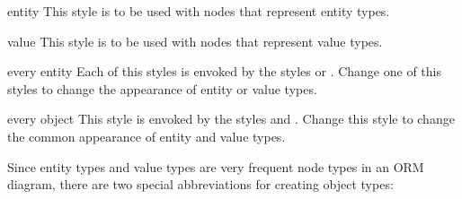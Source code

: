 \documentclass[a4paper,10pt]{article}
\begin{document}
\begin{stylekey}{entity}
This style is to be used with nodes that represent entity types.
\begin{codeexample}[]
\end{codeexample}
\end{stylekey}

\begin{stylekey}{value}
This style is to be used with nodes that represent value types.
\begin{codeexample}[]
\end{codeexample}
\end{stylekey}

\begin{stylekey}{every entity}
Each of this styles is envoked by the styles  or . Change one of this styles to change the appearance of entity or value types.
\begin{codeexample}[width=3cm]
\end{codeexample}
\end{stylekey}

\begin{stylekey}{every object}
  This style is envoked by the styles  and . Change this style to change the common appearance of entity and value types.
\begin{codeexample}[width=3cm]
\end{codeexample}
\end{stylekey}

\noindent
Since entity types and value types are very frequent node types in an ORM diagram, there are two special abbreviations for creating object types:
\end{document}
